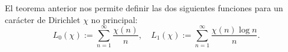 \documentclass[teoria-numeros.tex]{subfiles}
\begin{document}
El teorema anterior nos permite definir las dos siguientes funciones para un carácter de Dirichlet $\chi$ no principal:
$$ L_0(\chi) := \sum_{n=1}^\infty \frac{\chi(n)}{n}, \quad L_1(\chi) := \sum_{n=1}^\infty \frac{\chi(n)\log n}{n}. $$

\end{document}
